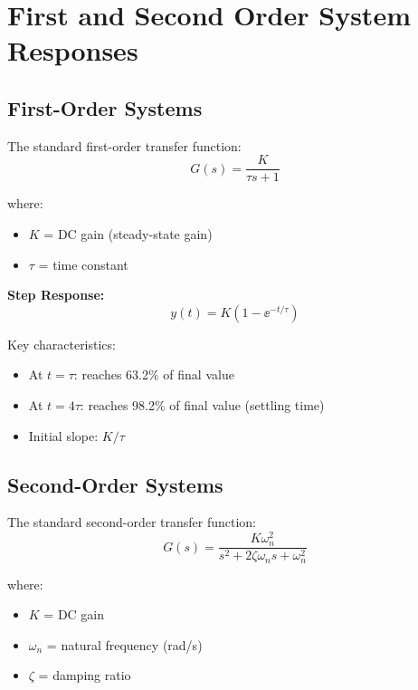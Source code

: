 

\chapter{First and Second Order System Responses}
\label{ch:standard_responses}

\section{First-Order Systems}

The standard first-order transfer function:
\begin{equation}
G(s) = \frac{K}{\tau s + 1}
\end{equation}

where:
\begin{itemize}
    \item $K$ = DC gain (steady-state gain)
    \item $\tau$ = time constant
\end{itemize}

\textbf{Step Response:}
\begin{equation}
y(t) = K\left(1 - \ee^{-t/\tau}\right)
\end{equation}

Key characteristics:
\begin{itemize}
    \item At $t = \tau$: reaches 63.2\% of final value
    \item At $t = 4\tau$: reaches 98.2\% of final value (settling time)
    \item Initial slope: $K/\tau$
\end{itemize}

\section{Second-Order Systems}

The standard second-order transfer function:
\begin{equation}
G(s) = \frac{K\omega_n^2}{s^2 + 2\zeta\omega_n s + \omega_n^2}
\end{equation}

where:
\begin{itemize}
    \item $K$ = DC gain
    \item $\omega_n$ = natural frequency (rad/s)
    \item $\zeta$ = damping ratio
\end{itemize}

